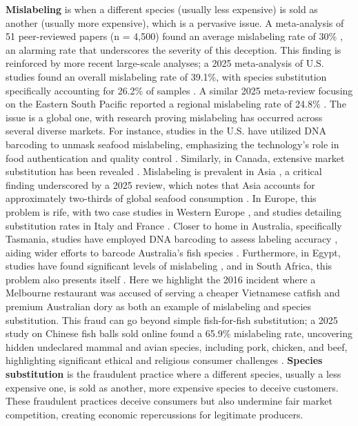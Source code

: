 \textbf{Mislabeling} is when a different species (usually less expensive) is sold as another (usually more expensive), which is a pervasive issue.
A meta-analysis of 51 peer-reviewed papers (n = 4,500) found an average mislabeling rate of 30\% \citep{Pardo2016}, an alarming rate that underscores the severity of this deception.
This finding is reinforced by more recent large-scale analyses; a 2025 meta-analysis of U.S. studies found an overall mislabeling rate of 39.1\%, with species substitution specifically accounting for 26.2\% of samples \citep{Ahles2025}. A similar 2025 meta-review focusing on the Eastern South Pacific reported a regional mislabeling rate of 24.8\% \citep{Marin2025}.
The issue is a global one, with research proving mislabeling has occurred across several diverse markets.
For instance, studies in the U.S. have utilized DNA barcoding to unmask seafood mislabeling, emphasizing the technology's role in food authentication and quality control \citep{Khaksar2015}. Similarly, in Canada, extensive market substitution has been revealed \citep{Hanner2011}. Mislabeling is prevalent in Asia \citep{Chin2016, Kannuchamy2016, Changizi2013}, a critical finding underscored by a 2025 review, which notes that Asia accounts for approximately two-thirds of global seafood consumption \citep{Do2025}. In Europe, this problem is rife, with two case studies in Western Europe \citep{Miller2012}, and studies detailing substitution rates in Italy \citep{Filonzi2010} and France \citep{BenardCapelle2015}. Closer to home in Australia, specifically Tasmania, studies have employed DNA barcoding to assess labeling accuracy \citep{Lamendin2015}, aiding wider efforts to barcode Australia's fish species \citep{Ward2005}. Furthermore, in Egypt, studies have found significant levels of mislabeling \citep{Galal2014}, and in South Africa, this problem also presents itself \citep{Cawthorn2015}. Here we highlight the 2016 incident where a Melbourne restaurant was accused of serving a cheaper Vietnamese catfish and premium Australian dory \citep{Australia2016} as both an example of mislabeling and species substitution. This fraud can go beyond simple fish-for-fish substitution; a 2025 study on Chinese fish balls sold online found a 65.9\% mislabeling rate, uncovering hidden undeclared mammal and avian species, including pork, chicken, and beef, highlighting significant ethical and religious consumer challenges \citep{Zhang2025}.
\textbf{Species substitution} is the fraudulent practice where a different species, usually a less expensive one, is sold as another, more expensive species to deceive customers. These fraudulent practices deceive consumers but also undermine fair market competition, creating economic repercussions for legitimate producers.

